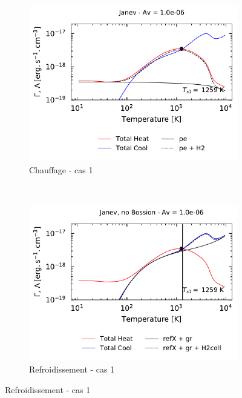 \begin{figure}[!p]
    \centering
    \begin{subfigure}[t]{0.49\textwidth} %
        \centering \includegraphics[trim = {0 0 0 1cm },clip,width=1\textwidth]{figure/H2/instabiliteH2/janev/GC_h_1p0em06_pe_h2.pdf}
        \caption{Chauffage - cas 1}
    \end{subfigure}
    ~ 
    \begin{subfigure}[t]{0.49\textwidth}
        \centering \includegraphics[trim = {0 0 0 1cm },clip,width=1\textwidth]{figure/H2/instabiliteH2/janev/GC_c_1p0em06_refx_gr_h2coll.pdf}
        \caption{Refroidissement - cas 1}
    \end{subfigure}


\end{figure}

